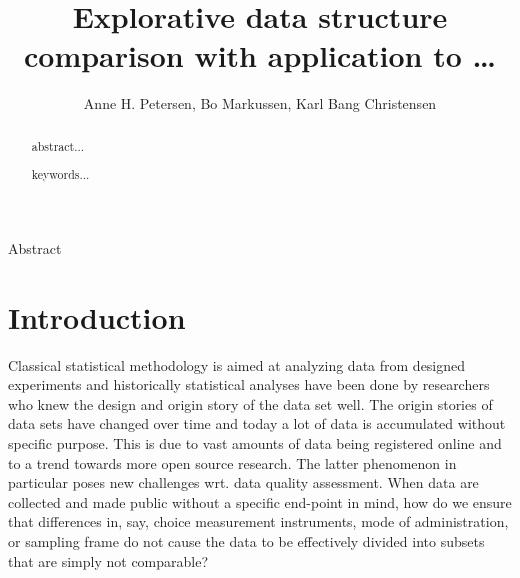 \documentclass[titlepage,11pt,twoside]{article}
\begin{document}

\title{Explorative data structure comparison with application to \ldots}

\author{Anne H. Petersen, Bo Markussen, Karl Bang Christensen}



\vspace{\fill}






\begin{center}\vskip3pt


\vspace{32pt}

Abstract\vskip3pt

\end{center}


\begin{abstract}
abstract...
\begin{keywords}
keywords...
\end{keywords}
\end{abstract}

\vspace{\fill}\newpage

\section{Introduction}
\label{sec:introduction}

Classical statistical methodology is aimed at analyzing data from designed experiments and historically statistical analyses have been done by researchers who knew the design and origin story of the data set well. The origin stories of data sets have changed over time and today a lot of data is accumulated without specific purpose. This is due to vast amounts of data being registered online and to a trend towards more open source research. The latter phenomenon in particular poses new challenges wrt. data quality assessment. When data are collected and made public without a specific end-point in mind, how do we ensure that differences in, say, choice measurement instruments, mode of administration, or sampling frame do not cause the data to be effectively divided into subsets that are simply not comparable?
\end{document}
